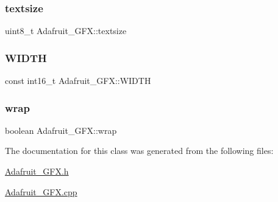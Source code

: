 \subsubsection{\texorpdfstring{textsize}{textsize}}
{\footnotesize\ttfamily uint8\+\_\+t Adafruit\+\_\+\+G\+F\+X\+::textsize\hspace{0.3cm}{\ttfamily [protected]}}

\mbox{\label{class_adafruit___g_f_x_ab693a8ac5d94c50c2558b5a3795ddde4}} 
\subsubsection{\texorpdfstring{W\+I\+D\+TH}{WIDTH}}
{\footnotesize\ttfamily const int16\+\_\+t Adafruit\+\_\+\+G\+F\+X\+::\+W\+I\+D\+TH\hspace{0.3cm}{\ttfamily [protected]}}

\mbox{\label{class_adafruit___g_f_x_ad6bd603e01861212829d536312a7190b}} 
\subsubsection{\texorpdfstring{wrap}{wrap}}
{\footnotesize\ttfamily boolean Adafruit\+\_\+\+G\+F\+X\+::wrap\hspace{0.3cm}{\ttfamily [protected]}}



The documentation for this class was generated from the following files\+:\begin{DoxyCompactItemize}
\item 
\hyperlink{_adafruit___g_f_x_8h}{Adafruit\+\_\+\+G\+F\+X.\+h}\item 
\hyperlink{_adafruit___g_f_x_8cpp}{Adafruit\+\_\+\+G\+F\+X.\+cpp}\end{DoxyCompactItemize}
